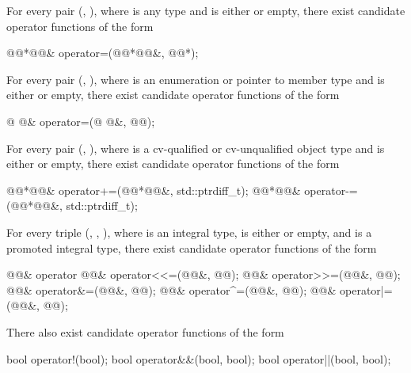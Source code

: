 \pnum
For every pair (, ), where  is any type and  is either
 or empty, there exist candidate operator functions of the form

\begin{codeblock}
@@*@@&   operator=(@@*@@&, @@*);
\end{codeblock}

\pnum
For every pair
(,
),
where
is an enumeration or pointer to member type and
is either
or empty,
there exist candidate operator functions of the form

\begin{codeblock}
@ @&   operator=(@ @&, @@);
\end{codeblock}

\pnum
For every pair
(,
),
where
is a cv-qualified or cv-unqualified object type and
is either
or empty,
there exist candidate operator functions of the form

\begin{codeblock}
@@*@@&   operator+=(@@*@@&, std::ptrdiff_t);
@@*@@&   operator-=(@@*@@&, std::ptrdiff_t);
\end{codeblock}

\pnum
For every triple
(,
,
),
where
is an integral type,
is either
or empty,
and
is a promoted integral type,
there exist candidate operator functions of the form

\begin{codeblock}
@@&   operator%
@@&   operator<<=(@@&, @@);
@@&   operator>>=(@@&, @@);
@@&   operator&=(@@&, @@);
@@&   operator^=(@@&, @@);
@@&   operator|=(@@&, @@);
\end{codeblock}

\pnum
There also exist candidate operator functions of the form

\begin{codeblock}
bool    operator!(bool);
bool    operator&&(bool, bool);
bool    operator||(bool, bool);
\end{codeblock}

